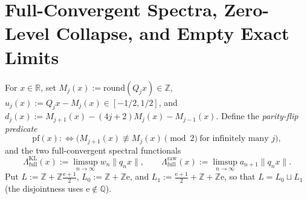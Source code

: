 \documentclass[11pt]{article}
\theoremstyle{definition}
\theoremstyle{remark}
\newcommand{\R}{\mathbb{R}}
\newcommand{\Z}{\mathbb{Z}}
\newcommand{\Q}{\mathbb{Q}}
\newcommand{\ee}{\mathrm{e}}
\newcommand{\Lam}{\Lambda}
\begin{document}
\section{Full-Convergent Spectra, Zero-Level Collapse, and Empty Exact Limits}\label{sec:full-spectra}

For $x\in\R$, set $M_j(x):=\mathrm{round}(Q_j x)\in\Z$, $u_j(x):=Q_j x-M_j(x)\in[-1/2,1/2]$,
and $d_j(x):=M_{j+1}(x)-(4j+2)M_j(x)-M_{j-1}(x)$. Define the
\emph{parity-flip predicate}
\[
\mathrm{pf}(x):\iff \bigl(M_{j+1}(x)\not\equiv M_j(x)\pmod 2\ \text{for infinitely many }j\bigr),
\]
and the two full-convergent spectral functionals
\[
\Lam_{\mathrm{full}}^{\mathrm{KL}}(x):=\limsup_{n\to\infty} w_n\|q_n x\|,\qquad
\Lam_{\mathrm{full}}^{\mathrm{raw}}(x):=\limsup_{n\to\infty} a_{n+1}\|q_n x\|.
\]
Put $L:=\Z+\Z\frac{\ee+1}{2}$, $L_0:=\Z+\Z\ee$, and $L_1:=\frac{\ee+1}{2}+\Z+\Z\ee$,
so that $L=L_0\sqcup L_1$ (the disjointness uses $\ee\notin\Q$).
\end{document}
